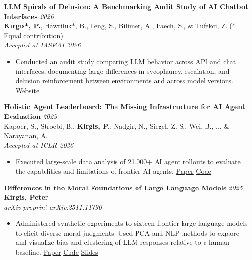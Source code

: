 \documentclass[11pt]{article}
\begin{document}
\vspace{1em}

\textbf{LLM Spirals of Delusion: A Benchmarking Audit Study of AI Chatbot Interfaces} \hfill \textit{2026}\\
\textbf{Kirgis*, P.}, Hawriluk*, B., Feng, S., Bilimer, A., Paech, S., \& Tufekci, Z. \quad (* Equal contribution)\\
\textit{Accepted at IASEAI 2026}
\begin{itemize}
    \item Conducted an audit study comparing LLM behavior across API and chat interfaces, documenting large differences in sycophancy, escalation, and delusion reinforcement between environments and across model versions.
    \hfill \href{https://llm-spirals-of-delusion.github.io/}{\underline{Website}}
\end{itemize}

\vspace{1em}

\textbf{Holistic Agent Leaderboard: The Missing Infrastructure for AI Agent Evaluation} \hfill \textit{2025}\\
Kapoor, S., Stroebl, B., \textbf{Kirgis, P.}, Nadgir, N., Siegel, Z. S., Wei, B., ... \& Narayanan, A.\\
\textit{Accepted at ICLR 2026}
\begin{itemize}
    \item Executed large-scale data analysis of 21,000+ AI agent rollouts to evaluate the capabilities and limitations of frontier AI agents.
    \hfill \href{https://arxiv.org/pdf/2510.11977}{\underline{Paper}} \quad\textbar\quad \href{https://github.com/peterkirgis/hal-paper-analysis}{\underline{Code}}
\end{itemize}

\vspace{1em}

\textbf{Differences in the Moral Foundations of Large Language Models} \hfill \textit{2025}\\
\textbf{Kirgis, Peter}\\
\textit{arXiv preprint arXiv:2511.11790}
\begin{itemize}
    \item Administered synthetic experiments to sixteen frontier large language models to elicit diverse moral judgments. Used PCA and NLP methods to explore and visualize bias and clustering of LLM responses relative to a human baseline.
    \hfill \href{https://arxiv.org/pdf/2511.11790}{\underline{Paper}} \quad\textbar\quad \href{https://github.com/peterkirgis/llm-moral-foundations}{\underline{Code}} \quad\textbar\quad \href{https://peterkirgis.github.io/files/MFT_LLMs_slides.pdf}{\underline{Slides}}
\end{itemize}
\end{document}
